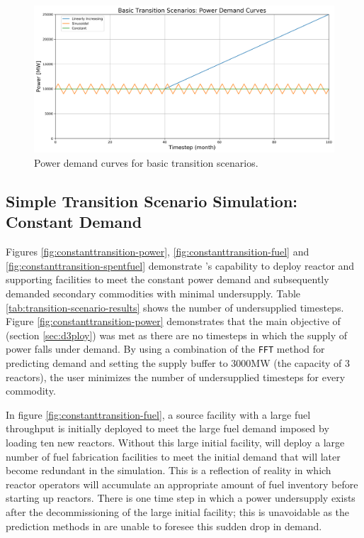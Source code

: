     \begin{figure}[]
        \begin{center}
            \includegraphics[scale=0.5]{./figures/powerplots.png}
        \end{center}
            \caption{Power demand curves for basic transition scenarios.}
        \label{fig:powerplots}
    \end{figure}

\subsection{Simple Transition Scenario Simulation: Constant Demand}
Figures \ref{fig:constanttransition-power}, \ref{fig:constanttransition-fuel}
and \ref{fig:constanttransition-spentfuel} demonstrate \deploy's capability 
to deploy reactor and supporting facilities to meet the
constant power demand and subsequently demanded 
secondary commodities with minimal undersupply. 
Table \ref{tab:transition-scenario-results} shows the number of 
undersupplied timesteps. 
Figure \ref{fig:constanttransition-power} demonstrates that
the main objective of \deploy (section \ref{sec:d3ploy}) 
was met as there are no timesteps
in which the supply of power falls under demand.
By using a combination of the \texttt{FFT} method for 
predicting demand and setting the supply buffer to 3000MW 
(the capacity of 3 reactors), the user minimizes the number of 
undersupplied timesteps for every commodity.

In figure \ref{fig:constanttransition-fuel},
a source facility with a large fuel throughput is initially
deployed to meet the large fuel demand imposed by loading ten 
new reactors. 
Without this large initial facility, \deploy will deploy 
a large number of fuel fabrication facilities to meet 
the initial demand that will later become redundant in 
the simulation. 
This is a reflection of reality in which reactor operators will 
accumulate an appropriate amount of fuel inventory before starting 
up reactors. 
There is one time step in which a power undersupply exists after the 
decommissioning of the large initial facility; 
this is unavoidable as the prediction methods in \deploy are 
unable to foresee this sudden drop in demand. 

